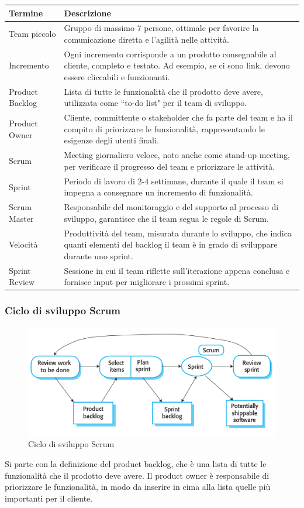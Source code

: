 \begin{center}
\begin{tabular}{|p{4cm}|p{9cm}|}
\hline
\textbf{Termine} & \textbf{Descrizione} \\
\hline
Team piccolo & Gruppo di massimo $7$ persone, ottimale per favorire la comunicazione diretta e l'agilità nelle attività. \\
\hline
Incremento & Ogni incremento corrisponde a un prodotto consegnabile al cliente, completo e testato. Ad esempio, se ci sono link, devono essere cliccabili e funzionanti. \\
\hline
Product Backlog & Lista di tutte le funzionalità che il prodotto deve avere, utilizzata come ``to-do list" per il team di sviluppo. \\
\hline
Product Owner & Cliente, committente o stakeholder che fa parte del team e ha il compito di priorizzare le funzionalità, rappresentando le esigenze degli utenti finali. \\
\hline
Scrum & Meeting giornaliero veloce, noto anche come stand-up meeting, per verificare il progresso del team e priorizzare le attività. \\
\hline
Sprint & Periodo di lavoro di $2$-$4$ settimane, durante il quale il team si impegna a consegnare un incremento di funzionalità. \\
\hline
Scrum Master & Responsabile del monitoraggio e del supporto al processo di sviluppo, garantisce che il team segua le regole di Scrum. \\
\hline
Velocità & Produttività del team, misurata durante lo sviluppo, che indica quanti elementi del backlog il team è in grado di sviluppare durante uno sprint. \\
\hline
Sprint Review & Sessione in cui il team riflette sull'iterazione appena conclusa e fornisce input per migliorare i prossimi sprint. \\
\hline
\end{tabular}
\end{center}

\subsubsection{Ciclo di sviluppo Scrum}
\begin{figure}[H]
    \centering
    \includegraphics[scale=0.6]{img/sprintcycle.png}
    \caption{Ciclo di sviluppo Scrum}
\end{figure}
Si parte con la definizione del product backlog, che è una lista di tutte le
funzionalità che il prodotto deve avere. Il product owner è responsabile di
priorizzare le funzionalità, in modo da inserire in cima alla lista quelle più
importanti per il cliente.

